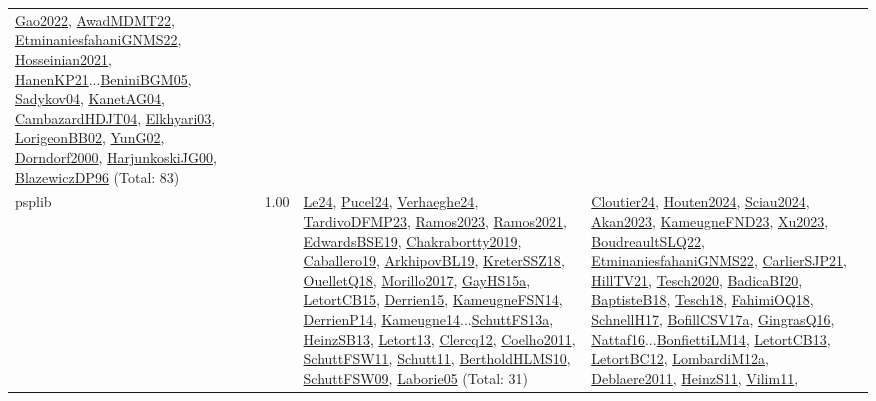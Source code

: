 {\begin{longtable}{p{3cm}r>{\raggedright\arraybackslash}p{6cm}>{\raggedright\arraybackslash}p{6cm}>{\raggedright\arraybackslash}p{8cm}}
\hyperref[detail:Gao2022]{Gao2022}, \hyperref[detail:AwadMDMT22]{AwadMDMT22}, \hyperref[detail:EtminaniesfahaniGNMS22]{EtminaniesfahaniGNMS22}, \hyperref[detail:Hosseinian2021]{Hosseinian2021}, \hyperref[detail:HanenKP21]{HanenKP21}...\hyperref[detail:BeniniBGM05]{BeniniBGM05}, \hyperref[detail:Sadykov04]{Sadykov04}, \hyperref[detail:KanetAG04]{KanetAG04}, \hyperref[detail:CambazardHDJT04]{CambazardHDJT04}, \hyperref[detail:Elkhyari03]{Elkhyari03}, \hyperref[detail:LorigeonBB02]{LorigeonBB02}, \hyperref[detail:YunG02]{YunG02}, \hyperref[detail:Dorndorf2000]{Dorndorf2000}, \hyperref[detail:HarjunkoskiJG00]{HarjunkoskiJG00}, \hyperref[detail:BlazewiczDP96]{BlazewiczDP96} (Total: 83)\\
\index{psplib}\index{Classification!psplib}psplib &  1.00 & \hyperref[detail:Le24]{Le24}, \hyperref[detail:Pucel24]{Pucel24}, \hyperref[detail:Verhaeghe24]{Verhaeghe24}, \hyperref[detail:TardivoDFMP23]{TardivoDFMP23}, \hyperref[detail:Ramos2023]{Ramos2023}, \hyperref[detail:Ramos2021]{Ramos2021}, \hyperref[detail:EdwardsBSE19]{EdwardsBSE19}, \hyperref[detail:Chakrabortty2019]{Chakrabortty2019}, \hyperref[detail:Caballero19]{Caballero19}, \hyperref[detail:ArkhipovBL19]{ArkhipovBL19}, \hyperref[detail:KreterSSZ18]{KreterSSZ18}, \hyperref[detail:OuelletQ18]{OuelletQ18}, \hyperref[detail:Morillo2017]{Morillo2017}, \hyperref[detail:GayHS15a]{GayHS15a}, \hyperref[detail:LetortCB15]{LetortCB15}, \hyperref[detail:Derrien15]{Derrien15}, \hyperref[detail:KameugneFSN14]{KameugneFSN14}, \hyperref[detail:DerrienP14]{DerrienP14}, \hyperref[detail:Kameugne14]{Kameugne14}...\hyperref[detail:SchuttFS13a]{SchuttFS13a}, \hyperref[detail:HeinzSB13]{HeinzSB13}, \hyperref[detail:Letort13]{Letort13}, \hyperref[detail:Clercq12]{Clercq12}, \hyperref[detail:Coelho2011]{Coelho2011}, \hyperref[detail:SchuttFSW11]{SchuttFSW11}, \hyperref[detail:Schutt11]{Schutt11}, \hyperref[detail:BertholdHLMS10]{BertholdHLMS10}, \hyperref[detail:SchuttFSW09]{SchuttFSW09}, \hyperref[detail:Laborie05]{Laborie05} (Total: 31) & \hyperref[detail:Cloutier24]{Cloutier24}, \hyperref[detail:Houten2024]{Houten2024}, \hyperref[detail:Sciau2024]{Sciau2024}, \hyperref[detail:Akan2023]{Akan2023}, \hyperref[detail:KameugneFND23]{KameugneFND23}, \hyperref[detail:Xu2023]{Xu2023}, \hyperref[detail:BoudreaultSLQ22]{BoudreaultSLQ22}, \hyperref[detail:EtminaniesfahaniGNMS22]{EtminaniesfahaniGNMS22}, \hyperref[detail:CarlierSJP21]{CarlierSJP21}, \hyperref[detail:HillTV21]{HillTV21}, \hyperref[detail:Tesch2020]{Tesch2020}, \hyperref[detail:BadicaBI20]{BadicaBI20}, \hyperref[detail:BaptisteB18]{BaptisteB18}, \hyperref[detail:Tesch18]{Tesch18}, \hyperref[detail:FahimiOQ18]{FahimiOQ18}, \hyperref[detail:SchnellH17]{SchnellH17}, \hyperref[detail:BofillCSV17a]{BofillCSV17a}, \hyperref[detail:GingrasQ16]{GingrasQ16}, \hyperref[detail:Nattaf16]{Nattaf16}...\hyperref[detail:BonfiettiLM14]{BonfiettiLM14}, \hyperref[detail:LetortCB13]{LetortCB13}, \hyperref[detail:LetortBC12]{LetortBC12}, \hyperref[detail:LombardiM12a]{LombardiM12a}, \hyperref[detail:Deblaere2011]{Deblaere2011}, \hyperref[detail:HeinzS11]{HeinzS11}, \hyperref[detail:Vilim11]{Vilim11}, 
\end{longtable}}

